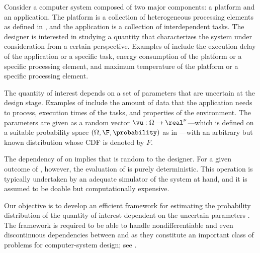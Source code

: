 Consider a computer system composed of two major components: a platform and an
application. The platform is a collection of heterogeneous processing elements
as defined in , and the application is a collection of
interdependent tasks. The designer is interested in studying a quantity \g that
characterizes the system under consideration from a certain perspective.
Examples of \g include the execution delay of the application or a specific
task, energy consumption of the platform or a specific processing element, and
maximum temperature of the platform or a specific processing element.

The quantity of interest \g depends on a set of parameters \vu that are
uncertain at the design stage. Examples of \vu include the amount of data that
the application needs to process, execution times of the tasks, and properties
of the environment. The parameters \vu are given as a random vector $\vu: \Omega
\to \real^\nu$---which is defined on a suitable probability space $(\Omega, \F,
\probability)$ as in ---with an arbitrary but known
distribution whose \ac{CDF} is denoted by $F$.

The dependency of \g on \vu implies that \g is random to the designer. For a
given outcome of \vu, however, the evaluation of \g is purely deterministic.
This operation is typically undertaken by an adequate simulator of the system at
hand, and it is assumed to be doable but computationally expensive.

Our objective is to develop an efficient framework for estimating the
probability distribution of the quantity of interest \g dependent on the
uncertain parameters \vu. The framework is required to be able to handle
nondifferentiable and even discontinuous dependencies between \g and \vu as they
constitute an important class of problems for computer-system design; see
.
